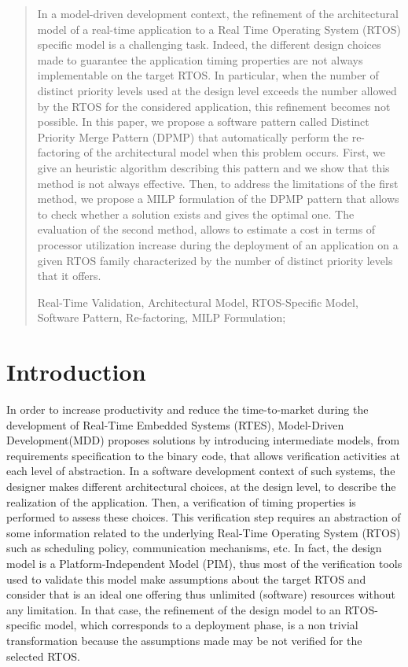 \documentclass[runningheads,a4paper]{llncs}
\newcommand{\keywords}[1]{\par\addvspace\baselineskip
\noindent\keywordname\enspace\ignorespaces#1}
\begin{document}
\begin{abstract}
In a model-driven development context, the refinement of the architectural model of a real-time application to a Real Time Operating System (RTOS) specific model is a challenging task. Indeed, the different design choices made to guarantee the application timing properties are not always implementable on the target RTOS. In particular, when the number of distinct priority levels used at the design level exceeds the number allowed by the RTOS for the considered application, this refinement becomes not possible. In this paper, we propose a software pattern called Distinct Priority Merge Pattern (DPMP) that automatically perform the re-factoring of the architectural model when this problem occurs. First, we give an heuristic algorithm describing this pattern and we show that this method is not always effective. Then, to address the limitations of the first method, we propose a MILP formulation of the DPMP pattern that allows to check whether a solution exists and gives the optimal one. The evaluation of the second method, allows to estimate a cost in terms of processor utilization increase during the deployment of an application on a given RTOS family characterized by the number of distinct priority levels that it offers.       

\keywords{Real-Time Validation, Architectural Model, RTOS-Specific Model, Software Pattern, Re-factoring, MILP Formulation;}
\end{abstract}


\section{Introduction}

In order to increase productivity and reduce the time-to-market during the development of Real-Time Embedded Systems (RTES), Model-Driven Development(MDD) proposes solutions by introducing intermediate models, from requirements specification to the binary code, that allows verification activities at each level of abstraction. In a software development context of such systems, the designer makes different architectural choices, at the design level, to describe the realization of the application. Then, a verification of timing properties is performed to assess these choices. This verification step requires an abstraction of some information related to the underlying Real-Time Operating System (RTOS) such as scheduling policy, communication mechanisms, etc. In fact, the design model is a Platform-Independent Model (PIM), thus most of the verification tools \cite{optimum}\cite{cheddar} used to validate this model make assumptions about the target RTOS and consider that is an ideal one offering thus unlimited (software) resources without any limitation. In that case, the refinement of the design model to an RTOS-specific model, which corresponds to a deployment phase, is a non trivial transformation because the assumptions made may be not verified for the selected RTOS. 
 
\end{document}
